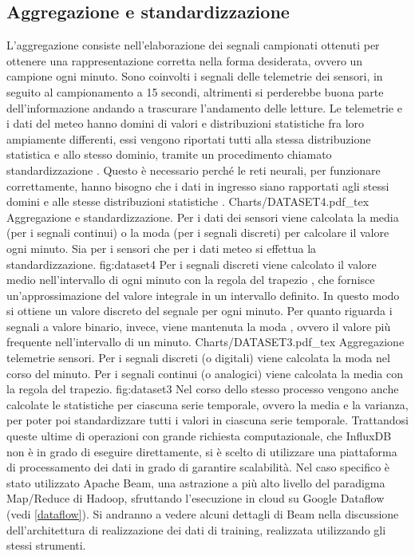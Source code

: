 \subsection{Aggregazione e standardizzazione}
L’aggregazione consiste nell’elaborazione dei segnali campionati ottenuti per ottenere una rappresentazione corretta nella forma desiderata, ovvero un campione ogni minuto. Sono coinvolti i segnali delle telemetrie dei sensori, in seguito al campionamento a 15 secondi, altrimenti si perderebbe buona parte dell’informazione andando a trascurare l’andamento delle letture. Le telemetrie e i dati del meteo hanno domini di valori e distribuzioni statistiche fra loro ampiamente differenti, essi vengono riportati tutti alla stessa distribuzione statistica e allo stesso dominio, tramite un procedimento chiamato standardizzazione \cite{ross_2014}. Questo è necessario perché le reti neurali, per funzionare correttamente, hanno bisogno che i dati in ingresso siano rapportati agli stessi domini e alle stesse distribuzioni statistiche \cite{aggarwal}.
\svg
{Charts/DATASET4.pdf_tex}
{Aggregazione e standardizzazione. Per i dati dei sensori viene calcolata la media (per i segnali continui) o la moda (per i segnali discreti) per calcolare il valore ogni minuto. Sia per i sensori che per i dati meteo si effettua la standardizzazione. }
{fig:dataset4}
Per i segnali discreti viene calcolato il valore medio nell’intervallo di ogni minuto con la regola del trapezio \cite{wikipedia_2019}, che fornisce un’approssimazione del valore integrale in un intervallo definito. In questo modo si ottiene un valore discreto del segnale per ogni minuto. Per quanto riguarda i segnali a valore binario, invece, viene mantenuta la moda \cite{ross_2014}, ovvero il valore più frequente nell’intervallo di un minuto.
\svg
{Charts/DATASET3.pdf_tex}
{Aggregazione telemetrie sensori. Per i segnali discreti (o digitali) viene calcolata la moda nel corso del minuto. Per i segnali continui (o analogici) viene calcolata la media con la regola del trapezio. }
{fig:dataset3}
Nel corso dello stesso processo vengono anche calcolate le statistiche per ciascuna serie temporale, ovvero la media e la varianza, per poter poi standardizzare tutti i valori in ciascuna serie temporale.
Trattandosi queste ultime di operazioni con grande richiesta computazionale, che InfluxDB non è in grado di eseguire direttamente, si è scelto di utilizzare una piattaforma di processamento dei dati in grado di garantire scalabilità. Nel caso specifico è stato utilizzato Apache Beam, una astrazione a più alto livello del paradigma Map/Reduce di Hadoop, sfruttando l’esecuzione in cloud su Google Dataflow (vedi \ref{dataflow}). Si andranno a vedere alcuni dettagli di Beam nella discussione dell’architettura di realizzazione dei dati di training, realizzata utilizzando gli stessi strumenti.
